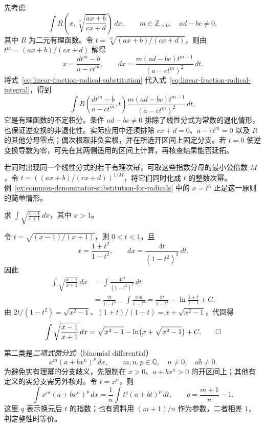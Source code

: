 先考虑
\begin{equation}
    \int R\left(x,\sqrt[m]{\frac{ax+b}{cx+d}}\right)\,dx,
    \qquad m\in\mathbb{Z}_{>0},\quad ad-bc\neq0,
    \label{eq:linear-fraction-radical-integral}
\end{equation}
其中 $R$ 为二元有理函数。令 $t=\sqrt[m]{(ax+b)/(cx+d)}$，则由 $t^m=(ax+b)/(cx+d)$ 解得
\begin{equation}
    x=\frac{dt^m-b}{a-ct^m},\qquad
    dx=\frac{m(ad-bc)t^{m-1}}{(a-ct^m)^2}\,dt.
    \label{eq:linear-fraction-radical-substitution}
\end{equation}
将式~\eqref{eq:linear-fraction-radical-substitution} 代入式~\eqref{eq:linear-fraction-radical-integral}，得到
\[
    \int R\left(\frac{dt^m-b}{a-ct^m},t\right)
        \frac{m(ad-bc)t^{m-1}}{(a-ct^m)^2}\,dt,
\]
它是有理函数的不定积分。条件 $ad-bc\neq0$ 排除了线性分式为常数的退化情形，也保证逆变换的非退化性。实际应用中还须排除 $cx+d=0$、$a-ct^m=0$ 以及 $R$ 的其他分母零点；偶次根取非负实根，并在所选开区间上固定分支。若 $t=0$ 使逆变换导数为零，可先在其两侧适用的区间上计算，再核查结果能否延拓。

若同时出现同一个线性分式的若干有理次幂，可取这些指数分母的最小公倍数 $M$，令 $t=((ax+b)/(cx+d))^{1/M}$，将它们同时化成 $t$ 的整数次幂。例~\ref{ex:common-denominator-substitution-for-radicals} 中的 $x=t^6$ 正是这一原则的简单情形。

\begin{example}
\label{ex:linear-fraction-radical-rationalization}
求 $\displaystyle\int\sqrt{\frac{x-1}{x+1}}\,dx$，其中 $x>1$。
\end{example}

\begin{solve}
令 $t=\sqrt{(x-1)/(x+1)}$，则 $0<t<1$，且
\[
    x=\frac{1+t^2}{1-t^2},\qquad dx=\frac{4t}{(1-t^2)^2}\,dt.
\]
因此
\begin{align*}
    \int\sqrt{\frac{x-1}{x+1}}\,dx
       &=\int\frac{4t^2}{(1-t^2)^2}\,dt\\
       &=\frac{2t}{1-t^2}-\int\frac{2\,dt}{1-t^2}
        =\frac{2t}{1-t^2}-\ln\frac{1+t}{1-t}+C.
\end{align*}
由 $2t/(1-t^2)=\sqrt{x^2-1}$、$(1+t)/(1-t)=x+\sqrt{x^2-1}$，代回得
\[
    \int\sqrt{\frac{x-1}{x+1}}\,dx
       =\sqrt{x^2-1}-\ln\bigl(x+\sqrt{x^2-1}\bigr)+C.
    \qedhere
\]
\end{solve}

第二类是\emph{二项式微分式}（binomial differential）
\begin{equation}
    x^m(a+bx^n)^p\,dx,
    \qquad m,n,p\in\mathbb{Q},\quad n\neq0,\quad ab\neq0.
    \label{eq:binomial-differential}
\end{equation}
为避免实有理幂的分支歧义，先限制在 $x>0$、$a+bx^n>0$ 的开区间上；其他有定义的实分支需另外核对。令 $t=x^n$，则
\begin{equation}
    \int x^m(a+bx^n)^p\,dx
       =\frac1n\int t^q(a+bt)^p\,dt,
    \qquad q=\frac{m+1}{n}-1.
    \label{eq:binomial-differential-standard-form}
\end{equation}
这里 $q$ 表示换元后 $t$ 的指数；也有资料用 $(m+1)/n$ 作为参数，二者相差 $1$，判定整性时等价。

